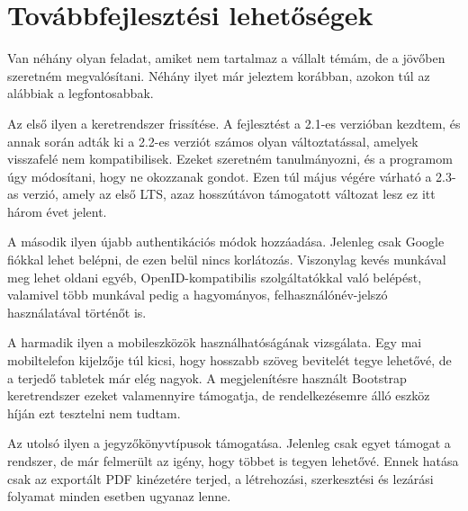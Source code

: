 \documentclass[a4paper,12pt,oneside]{report}
\begin{document}

\section{Továbbfejlesztési lehetőségek}

Van néhány olyan feladat, amiket nem tartalmaz a vállalt témám, de a jövőben szeretném megvalósítani. Néhány ilyet már jeleztem korábban, azokon túl az alábbiak a legfontosabbak.

Az első ilyen a keretrendszer frissítése. A fejlesztést a 2.1-es verzióban kezdtem, és annak során adták ki a 2.2-es verziót számos olyan változtatással, amelyek visszafelé nem kompatibilisek. Ezeket szeretném tanulmányozni, és a programom úgy módosítani, hogy ne okozzanak gondot. Ezen túl május végére várható a 2.3-as verzió, amely az első LTS, azaz hosszútávon támogatott változat lesz \textendash{} ez itt három évet jelent.

A második ilyen újabb authentikációs módok hozzáadása. Jelenleg csak Google fiókkal lehet belépni, de ezen belül nincs korlátozás. Viszonylag kevés munkával meg lehet oldani egyéb, OpenID-kompatibilis szolgáltatókkal való belépést, valamivel több munkával pedig a hagyományos, felhasználónév-jelszó használatával történőt is.

A harmadik ilyen a mobileszközök használhatóságának vizsgálata. Egy mai mobiltelefon kijelzője túl kicsi, hogy hosszabb szöveg bevitelét tegye lehetővé, de a terjedő tabletek már elég nagyok. A megjelenítésre használt Bootstrap keretrendszer ezeket valamennyire támogatja, de rendelkezésemre álló eszköz híján ezt tesztelni nem tudtam.

Az utolsó ilyen a jegyzőkönyvtípusok támogatása. Jelenleg csak egyet támogat a rendszer, de már felmerült az igény, hogy többet is tegyen lehetővé. Ennek hatása csak az exportált PDF kinézetére terjed, a létrehozási, szerkesztési és lezárási folyamat minden esetben ugyanaz lenne.

%
%
\end{document}
